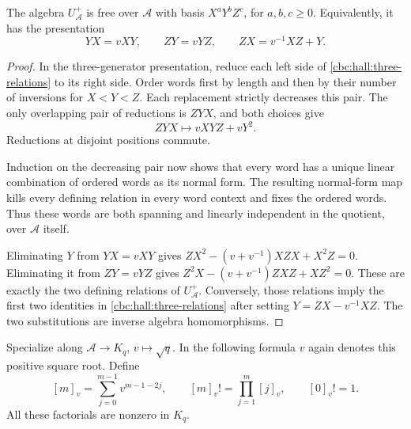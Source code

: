 \begin{proposition}\label{cbc:hall:normal}
The algebra $U_{\mathcal A}^+$ is free over $\mathcal A$ with basis
$X^aY^bZ^c$, for $a,b,c\geq0$.  Equivalently, it has the presentation
\begin{equation}\label{cbc:hall:three-relations}
 YX=vXY,\qquad ZY=vYZ,\qquad ZX=v^{-1}XZ+Y.
\end{equation}
\end{proposition}
\begin{proof}
In the three-generator presentation, reduce each left side of
\eqref{cbc:hall:three-relations} to its right side.  Order words first by
length and then by their number of inversions for $X<Y<Z$.  Each replacement
strictly decreases this pair.  The only overlapping pair of reductions is
$ZYX$, and both choices give
\[
 ZYX\longmapsto vXYZ+vY^2.
\]
Reductions at disjoint positions commute.

Induction on the decreasing pair
now shows that every word has a unique linear combination of ordered words
as its normal form.  The resulting normal-form map kills every defining
relation in every word context and fixes the ordered words.  Thus these words
are both spanning and linearly independent in the quotient, over
$\mathcal A$ itself.

Eliminating $Y$ from $YX=vXY$ gives
$ZX^2-(v+v^{-1})XZX+X^2Z=0$.  Eliminating it from $ZY=vYZ$ gives
$Z^2X-(v+v^{-1})ZXZ+XZ^2=0$.  These are exactly the two defining relations
of $U_{\mathcal A}^+$.  Conversely, those relations imply the first two
identities in \eqref{cbc:hall:three-relations} after setting
$Y=ZX-v^{-1}XZ$.  The two substitutions are inverse algebra homomorphisms.
\end{proof}

Specialize along $\mathcal A\to K_q$, $v\mapsto\sqrt q$.  In the following
formula $v$ again denotes this positive square root.  Define
\[
 [m]_v=\sum_{j=0}^{m-1}v^{m-1-2j},\qquad
 [m]_v!=\prod_{j=1}^m[j]_v,\qquad [0]_v!=1.
\]
All these factorials are nonzero in $K_q$.


